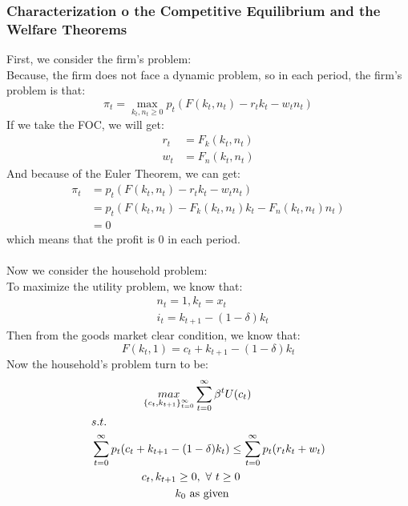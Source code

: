 \documentclass{article}
\begin{document}
\subsubsection{Characterization o the Competitive Equilibrium and the Welfare Theorems}
First, we consider the firm's problem:\\
\indent Because, the firm does not face a dynamic problem, so in each period, the firm's problem is that:
\begin{equation*}
	\pi_t = \mathop{max}\limits_{k_t, n_t \geq 0} p_t(F(k_t, n_t) - r_t k_t - w_t n_t)
\end{equation*}
\indent If we take the FOC, we will get:
\begin{align*}
	r_t &= F_k(k_t, n_t)\\
	w_t &= F_n(k_t, n_t)
\end{align*}
\indent And because of the Euler Theorem, we can get:
\begin{align*}
	\pi_t &= p_t (F(k_t, n_t) - r_t k_t - w_t n_t)\\
	&= p_t(F(k_t, n_t) - F_k(k_t, n_t)k_t - F_n(k_t, n_t)n_t)\\
	&= 0
\end{align*}
\indent which means that the profit is 0 in each period.\\\\
Now we consider the household problem:\\
\indent To maximize the utility problem, we know that:
\begin{align*}
	&n_t = 1, k_t = x_t\\
	&i_t = k_{t+1} - (1 - \delta)k_t
\end{align*}
\indent Then from the goods market clear condition, we know that:
\begin{equation*}
	F(k_t, 1) = c_t + k_{t+1} - (1 - \delta)k_t
\end{equation*}
\indent Now the household's problem turn to be:
\begin{align*}
	&\indent\indent\indent \mathop{max}\limits_{\{c_t, k_{t+1}\}^\infty_{t=0}} \sum\limits^\infty_{t=0} \beta^t U(c_t)\\
	&s.t.\\
	& \sum\limits^\infty_{t=0} p_t(c_t + k_{t+1} - (1 - \delta)k_t) \leq \sum\limits^\infty_{t=0} p_t(r_t k_t + w_t)\\
	&\indent\indent\indent c_t, k_{t+1} \geq 0,\ \forall\ t \geq 0\\
	&\indent\indent\indent\indent\indent k_0\ \text{as given}
\end{align*}
\end{document}
